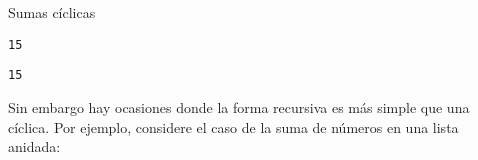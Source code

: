 \begin{code} Sumas cíclicas
\begin{Shaded}
\begin{Highlighting}[]
\OperatorTok{=}\NormalTok{ [}\NormalTok{, }\NormalTok{, }\NormalTok{, }\NormalTok{, }\NormalTok{]}

 \OperatorTok{=} 
     \OperatorTok{+=}\NormalTok{ L[}\NormalTok{]}
\OperatorTok{=}\NormalTok{ L[}\NormalTok{:]}

\end{Highlighting}
\end{Shaded}

\begin{verbatim}
15
\end{verbatim}

\begin{Shaded}
\begin{Highlighting}[]
\OperatorTok{=}\NormalTok{ [}\NormalTok{, }\NormalTok{, }\NormalTok{, }\NormalTok{, }\NormalTok{]}

 \OperatorTok{=} 
     \OperatorTok{+=}

\end{Highlighting}
\end{Shaded}

\begin{verbatim}
15

\end{verbatim}
\end{code}


Sin embargo hay ocasiones donde la forma recursiva es más simple que una
cíclica. Por ejemplo, considere el caso de la suma de números en una
lista anidada:

\begin{Shaded}
\begin{Highlighting}[]
\NormalTok{[}\NormalTok{, [}\NormalTok{, [}\NormalTok{, }\NormalTok{], }\NormalTok{], }\NormalTok{, [}\NormalTok{, }\NormalTok{], [[}\NormalTok{], [}\NormalTok{]]]}
\end{Highlighting}
\end{Shaded}

